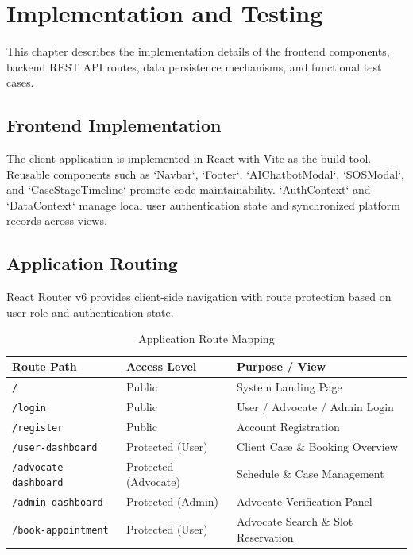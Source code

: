 \chapter{Implementation and Testing}

This chapter describes the implementation details of the frontend components, backend REST API routes, data persistence mechanisms, and functional test cases.

\section{Frontend Implementation}
The client application is implemented in React with Vite as the build tool. Reusable components such as `Navbar`, `Footer`, `AIChatbotModal`, `SOSModal`, and `CaseStageTimeline` promote code maintainability. `AuthContext` and `DataContext` manage local user authentication state and synchronized platform records across views.

\section{Application Routing}
React Router v6 provides client-side navigation with route protection based on user role and authentication state.

\begin{table}[h!]
    \centering
    \caption{Application Route Mapping}
    \label{tab:routes}
    \begin{tabular}{p{4.5cm} p{4.5cm} p{5cm}}
        \toprule
        \textbf{Route Path} & \textbf{Access Level} & \textbf{Purpose / View} \\
        \midrule
        \texttt{/} & Public & System Landing Page \\
        \texttt{/login} & Public & User / Advocate / Admin Login \\
        \texttt{/register} & Public & Account Registration \\
        \texttt{/user-dashboard} & Protected (User) & Client Case \& Booking Overview \\
        \texttt{/advocate-dashboard} & Protected (Advocate) & Schedule \& Case Management \\
        \texttt{/admin-dashboard} & Protected (Admin) & Advocate Verification Panel \\
        \texttt{/book-appointment} & Protected (User) & Advocate Search \& Slot Reservation \\
        \bottomrule
    \end{tabular}
\end{table}

